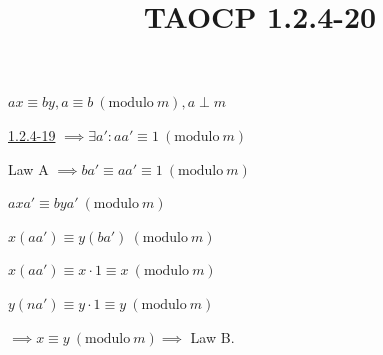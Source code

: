 \documentclass{article}
\title{TAOCP 1.2.4\mbox{-}20}
\begin{document}
\maketitle

\( ax \equiv by, a \equiv b\ (\mathrm{modulo}\ m), a \perp m \)

\href{./1.2.4-19.pdf}{1.2.4\mbox{-}19} \( \implies \exists a': aa' \equiv 1\ (\mathrm{modulo}\ m) \)

Law A \( \implies ba' \equiv aa' \equiv 1\ (\mathrm{modulo}\ m) \)

\( axa' \equiv bya'\ (\mathrm{modulo}\ m) \)

\( x(aa') \equiv y(ba')\ (\mathrm{modulo}\ m) \)

\( x(aa') \equiv x\cdot 1 \equiv x\ (\mathrm{modulo}\ m) \)

\( y(na') \equiv y\cdot 1 \equiv y\ (\mathrm{modulo}\ m) \)

\( \implies x \equiv y\ (\mathrm{modulo}\ m) \implies \) Law B.
\end{document}
